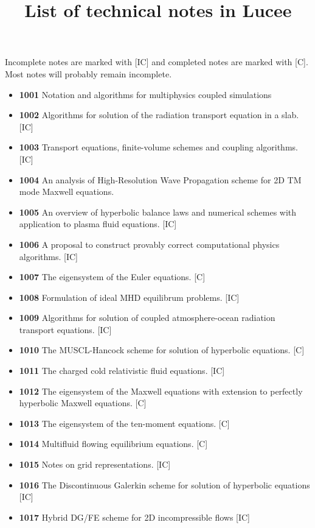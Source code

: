 \documentclass[11pt]{article}
\title{List of technical notes in Lucee}
\author{}
\date{}
\begin{document}
\maketitle

Incomplete notes are marked with [IC] and completed notes are marked
with [C]. Most notes will probably remain incomplete.

\begin{itemize}
\item {\bf 1001} Notation and algorithms for multiphysics coupled
  simulations
\item {\bf 1002} Algorithms for solution of the radiation transport
  equation in a slab. [IC]
\item {\bf 1003} Transport equations, finite-volume schemes and
  coupling algorithms. [IC]
\item {\bf 1004} An analysis of High-Resolution Wave Propagation
  scheme for 2D TM mode Maxwell equations.
\item {\bf 1005} An overview of hyperbolic balance laws and
  numerical schemes with application to plasma fluid equations. [IC]
\item {\bf 1006} A proposal to construct provably correct
  computational physics algorithms. [IC]
\item {\bf 1007} The eigensystem of the Euler equations. [C]
\item {\bf 1008} Formulation of ideal MHD equilibrum problems. [IC]
\item {\bf 1009} Algorithms for solution of coupled atmosphere-ocean
  radiation transport equations. [IC]
\item {\bf 1010} The MUSCL-Hancock scheme for solution of hyperbolic
  equations. [C]
\item {\bf 1011} The charged cold relativistic fluid equations. [IC]
\item {\bf 1012} The eigensystem of the Maxwell equations with
  extension to perfectly hyperbolic Maxwell equations. [C]
\item {\bf 1013} The eigensystem of the ten-moment equations. [C]
\item {\bf 1014} Multifluid flowing equilibrium equations. [C]
\item {\bf 1015} Notes on grid representations. [IC]
\item {\bf 1016} The Discontinuous Galerkin scheme for solution of
  hyperbolic equations [IC]
\item {\bf 1017} Hybrid DG/FE scheme for 2D incompressible flows [IC]
\end{itemize}
\end{document}
